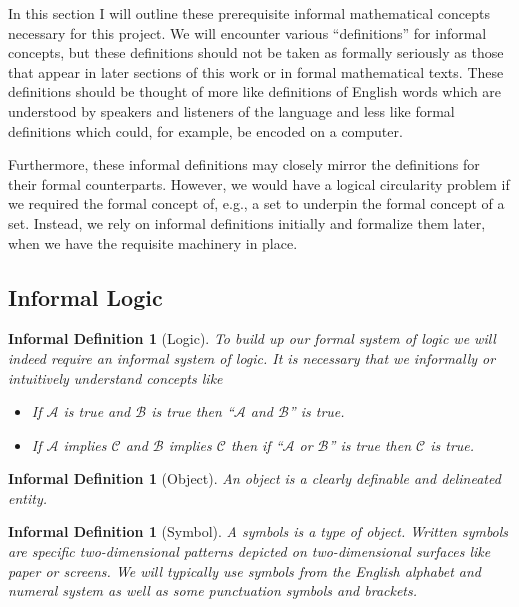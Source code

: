 \documentclass[12pt]{article}
\theoremstyle{break}
\theoremstyle{break}
\theoremstyle{break}
\theoremstyle{break}
\theoremstyle{break}
\newtheorem{informal definition}[definition]{Informal Definition}
\theoremstyle{break}
\newtheorem{informal theorem}[theorem]{Informal Theorem}
\newcommand{\mc}[1]{\mathcal{#1}}
\newcommand{\qq}[1]{``#1''}
\begin{document}
In this section I will outline these prerequisite informal mathematical concepts necessary for this project.
We will encounter various \qq{definitions} for informal concepts, but these definitions should not be taken as formally seriously as those that appear in later sections of this work or in formal mathematical texts.
These definitions should be thought of more like definitions of English words which are understood by speakers and listeners of the language and less like formal definitions which could, for example, be encoded on a computer.

Furthermore, these informal definitions may closely mirror the definitions for their formal counterparts.
However, we would have a logical circularity problem if we required the formal concept of, e.g., a set to underpin the formal concept of a set.
Instead, we rely on informal definitions initially and formalize them later, when we have the requisite machinery in place.


\subsection{Informal Logic}

\begin{informal definition}[Logic]
To build up our formal system of logic we will indeed require an informal system of logic.
It is necessary that we informally or intuitively understand concepts like
\begin{itemize}
\item{If $\mc{A}$ is true and $\mc{B}$ is true then \qq{$\mc{A}$ and $\mc{B}$} is true.}
\item{If $\mc{A}$ implies $\mc{C}$ and $\mc{B}$ implies $\mc{C}$ then if \qq{$\mc{A}$ or $\mc{B}$} is true then $\mc{C}$ is true.}
\end{itemize}
\end{informal definition}

\begin{informal definition}[Object]
An object is a clearly definable and delineated entity.
\end{informal definition}

\begin{informal definition}[Symbol]
A symbols is a type of object.
Written symbols are specific two-dimensional patterns depicted on two-dimensional surfaces like paper or screens.
We will typically use symbols from the English alphabet and numeral system as well as some punctuation symbols and brackets.
\end{informal definition}
\end{document}
